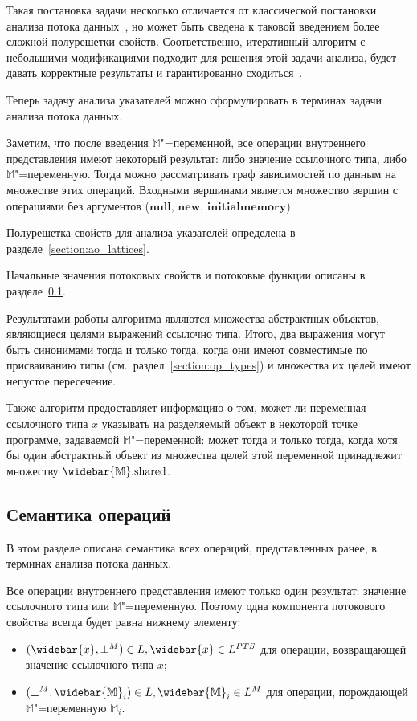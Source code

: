 \documentclass[14pt,titlepage,draft]{extarticle}
\newcommand{\M}{\ensuremath{\mathbb{M}}}
\newcommand{\Ms}{\ensuremath{\mathbb{\widebar{M}}}}
\newcommand{\Mf}[1]{\ensuremath{\mathrm{#1}}}
\newcommand{\op}[1]{\mathbf{#1}}
\newcommand{\pts}[1]{\widebar{#1}}
\begin{document}
    Такая постановка задачи несколько отличается от классической постановки
    анализа потока данных~\cite{muchnick, nielson}, но может быть сведена к
    таковой введением более сложной полурешетки свойств.
    Соответственно, итеративный алгоритм с небольшими модификациями подходит
    для решения этой задачи анализа, будет давать корректные результаты и
    гарантированно сходиться~\cite{kildall}.

    Теперь задачу анализа указателей можно сформулировать в терминах задачи
    анализа потока данных.

    Заметим, что после введения \M"=переменной, все операции внутреннего
    представления имеют некоторый результат: либо значение ссылочного типа,
    либо \M"=переменную. Тогда можно рассматривать граф зависимостей по данным
    на множестве этих операций. Входными вершинами является множество вершин с
    операциями без аргументов
    ($\op{null}$, $\op{new}$, $\op{initialmemory}$).

    Полурешетка свойств для анализа указателей определена в
    разделе~\ref{section:ao_lattices}.

    Начальные значения потоковых свойств и потоковые функции описаны
    в разделе~\ref{section:flow_functions}.

    Результатами работы алгоритма являются множества абстрактных объектов,
    являющиеся целями выражений ссылочно типа. Итого, два выражения могут быть
    синонимами тогда и только тогда, когда они имеют совместимые по
    присваиванию типы (см.~раздел~\ref{section:op_types}) и множества их целей
    имеют непустое пересечение.

    Также алгоритм предоставляет информацию о том, может ли переменная
    ссылочного типа $x$ указывать на разделяемый объект в некоторой точке
    программе, задаваемой \M"=переменной: может тогда и только тогда, когда
    хотя бы один абстрактный объект из множества целей этой переменной
    принадлежит множеству $\Ms.\Mf{shared}$.

  \subsection{Семантика операций}
    \label{section:flow_functions}

    В этом разделе описана семантика всех операций, представленных ранее, в
    терминах анализа потока данных.

    Все операции внутреннего представления имеют только один результат:
    значение ссылочного типа или \M"=переменную. Поэтому одна компонента
    потокового свойства всегда будет равна нижнему элементу:
    \begin{itemize}
      \item $(\pts{x}, \bot^M) \in L, \pts{x} \in L^{PTS}$ для операции,
            возвращающей значение ссылочного типа $x$;
      \item $(\bot^M, \Ms_i) \in L, \Ms_i \in L^M$ для операции, порождающей
            \M"=переменную $\M_i$.
    \end{itemize}
\end{document}
